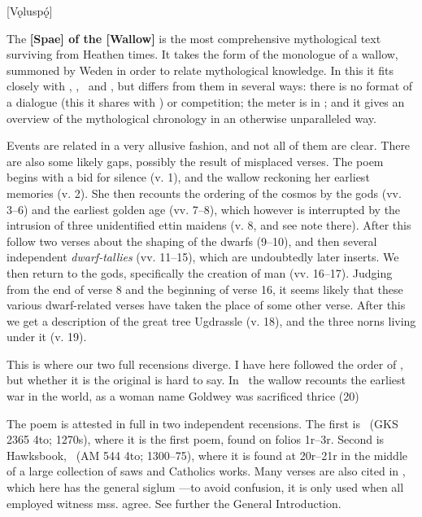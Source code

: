 [Vǫluspǫ́]


The \textbf{[Spae] of the [Wallow]} is the most comprehensive mythological text surviving from Heathen times. It takes the form of the monologue of a wallow, summoned by Weden in order to relate mythological knowledge. In this it fits closely with \Vafthrudnismal, \Grimnismal, \Sigrdrifumal\ and \Allvismal, but differs from them in several ways: there is no format of a dialogue (this it shares with \Grimnismal) or competition; the meter is in \Fornyrdislag; and it gives an overview of the mythological chronology in an otherwise unparalleled way.

Events are related in a very allusive fashion, and not all of them are clear. There are also some likely gaps, possibly the result of misplaced verses. The poem begins with a bid for silence (v. 1), and the wallow reckoning her earliest memories (v. 2). She then recounts the ordering of the cosmos by the gods (vv. 3–6) and the earliest golden age (vv. 7–8), which however is interrupted by the intrusion of three unidentified ettin maidens (v. 8, and see note there). After this follow two verses about the shaping of the dwarfs (9–10), and then several independent \emph{dwarf-tallies} (vv. 11–15), which are undoubtedly later inserts. We then return to the gods, specifically the creation of man (vv. 16–17). Judging from the end of verse 8 and the beginning of verse 16, it seems likely that these various dwarf-related verses have taken the place of some other verse. After this we get a description of the great tree Ugdrassle (v. 18), and the three norns living under it (v. 19).

This is where our two full recensions diverge. I have here followed the order of \Regius, but whether it is the original is hard to say. In \Regius\ the wallow recounts the earliest war in the world, as a woman name Goldwey was sacrificed thrice (20)%

The poem is attested in full in two independent recensions. The first is \Regius\ (GKS 2365 4to; 1270s), where it is the first poem, found on folios 1r–3r. Second is Hawksbook, \Hauksbok\ (AM 544 4to; 1300–75), where it is found at 20r–21r in the middle of a large collection of saws and Catholics works. Many verses are also cited in \Gylfaginning, which here has the general siglum \GylfMS—to avoid confusion, it is only used when all employed witness mss. agree. See further the General Introduction. %

